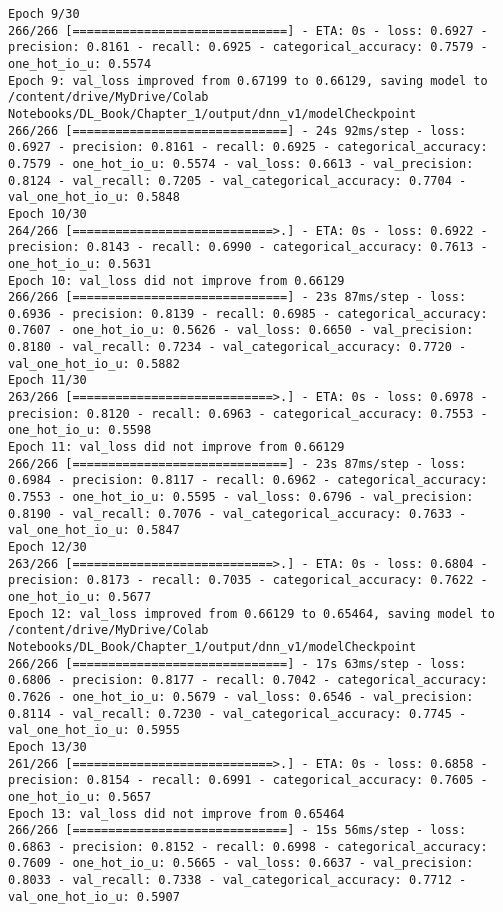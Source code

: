 \documentclass[
  letterpaper,
  DIV=11,
  numbers=noendperiod]{scrreprt}
\begin{document}
\begin{verbatim}
Epoch 9/30
266/266 [==============================] - ETA: 0s - loss: 0.6927 - precision: 0.8161 - recall: 0.6925 - categorical_accuracy: 0.7579 - one_hot_io_u: 0.5574
Epoch 9: val_loss improved from 0.67199 to 0.66129, saving model to /content/drive/MyDrive/Colab Notebooks/DL_Book/Chapter_1/output/dnn_v1/modelCheckpoint
266/266 [==============================] - 24s 92ms/step - loss: 0.6927 - precision: 0.8161 - recall: 0.6925 - categorical_accuracy: 0.7579 - one_hot_io_u: 0.5574 - val_loss: 0.6613 - val_precision: 0.8124 - val_recall: 0.7205 - val_categorical_accuracy: 0.7704 - val_one_hot_io_u: 0.5848
Epoch 10/30
264/266 [============================>.] - ETA: 0s - loss: 0.6922 - precision: 0.8143 - recall: 0.6990 - categorical_accuracy: 0.7613 - one_hot_io_u: 0.5631
Epoch 10: val_loss did not improve from 0.66129
266/266 [==============================] - 23s 87ms/step - loss: 0.6936 - precision: 0.8139 - recall: 0.6985 - categorical_accuracy: 0.7607 - one_hot_io_u: 0.5626 - val_loss: 0.6650 - val_precision: 0.8180 - val_recall: 0.7234 - val_categorical_accuracy: 0.7720 - val_one_hot_io_u: 0.5882
Epoch 11/30
263/266 [============================>.] - ETA: 0s - loss: 0.6978 - precision: 0.8120 - recall: 0.6963 - categorical_accuracy: 0.7553 - one_hot_io_u: 0.5598
Epoch 11: val_loss did not improve from 0.66129
266/266 [==============================] - 23s 87ms/step - loss: 0.6984 - precision: 0.8117 - recall: 0.6962 - categorical_accuracy: 0.7553 - one_hot_io_u: 0.5595 - val_loss: 0.6796 - val_precision: 0.8190 - val_recall: 0.7076 - val_categorical_accuracy: 0.7633 - val_one_hot_io_u: 0.5847
Epoch 12/30
263/266 [============================>.] - ETA: 0s - loss: 0.6804 - precision: 0.8173 - recall: 0.7035 - categorical_accuracy: 0.7622 - one_hot_io_u: 0.5677
Epoch 12: val_loss improved from 0.66129 to 0.65464, saving model to /content/drive/MyDrive/Colab Notebooks/DL_Book/Chapter_1/output/dnn_v1/modelCheckpoint
266/266 [==============================] - 17s 63ms/step - loss: 0.6806 - precision: 0.8177 - recall: 0.7042 - categorical_accuracy: 0.7626 - one_hot_io_u: 0.5679 - val_loss: 0.6546 - val_precision: 0.8114 - val_recall: 0.7230 - val_categorical_accuracy: 0.7745 - val_one_hot_io_u: 0.5955
Epoch 13/30
261/266 [============================>.] - ETA: 0s - loss: 0.6858 - precision: 0.8154 - recall: 0.6991 - categorical_accuracy: 0.7605 - one_hot_io_u: 0.5657
Epoch 13: val_loss did not improve from 0.65464
266/266 [==============================] - 15s 56ms/step - loss: 0.6863 - precision: 0.8152 - recall: 0.6998 - categorical_accuracy: 0.7609 - one_hot_io_u: 0.5665 - val_loss: 0.6637 - val_precision: 0.8033 - val_recall: 0.7338 - val_categorical_accuracy: 0.7712 - val_one_hot_io_u: 0.5907

\end{verbatim}
\end{document}
